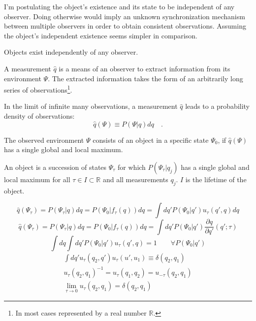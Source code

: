 I'm postulating the object's existence and its state to be independent of any observer.
Doing otherwise would imply an unknown synchronization mechanism between multiple observers in order to obtain consistent observations. Assuming the object's independent existence seems simpler in comparison.
\begin{axiom}
Objects exist independently of any observer.
\end{axiom}
\begin{definition}
A measurement $\hat{q}$ is a means of an observer to extract information from its environment $\Psi$. The extracted information takes the form of an arbitrarily long series of observations\footnote{In most cases represented by a real number $\mathbb{R}$.}.
\end{definition}
In the limit of infinite many observations, a measurement $\hat{q}$ leads to a probability density of observations:
\begin{equation}
\hat{q}(\Psi)\equiv P(\Psi\rvert q)dq\quad.
\end{equation}
\begin{definition}
The observed environment $\Psi$ consists of an object in a specific state $\Psi_0$, if $\hat{q}(\Psi)$ has a single global and local maximum.
\end{definition}
\begin{definition}
An object is a succession of states $\Psi_\tau$ for which $P(\Psi_\tau\rvert q_j)$ has a single global and local maximum for all $\tau\in I\subset\mathbb{R}$ and all measurements $q_j$. $I$ is the lifetime of the object.
\end{definition}
\begin{equation}
\hat{q}(\Psi_\tau)=P(\Psi_\tau\rvert q)dq=P(\Psi_0\rvert f_\tau(q))dq=\int dq' P(\Psi_0\rvert q')u_\tau(q',q)dq
\end{equation}
\begin{equation}
\hat{q}(\Psi_\tau)=P(\Psi_\tau\rvert q)dq=P(\Psi_0\rvert f_\tau(q))dq=\int dq' P(\Psi_0\rvert q')\frac{\partial q}{\partial q'}(q';\tau)
\end{equation}
\begin{equation}
\int dq\int dq' P(\Psi_0\rvert q')u_\tau(q',q) = 1\qquad\forall P(\Psi_0\rvert q')
\end{equation}
\begin{subequations}
\begin{eqnarray}
\int dq' u_\tau(q_2,q')u_\tau(u',u_1)\equiv\delta(q_2,q_1)\\
u_\tau(q_2,q_1)^{-1}= u_\tau(q_1,q_2)= u_{-\tau}(q_2,q_1)\\
\lim_{\tau\rightarrow 0}u_\tau(q_2,q_1)=\delta(q_2,q_1)
\end{eqnarray}
\end{subequations}
